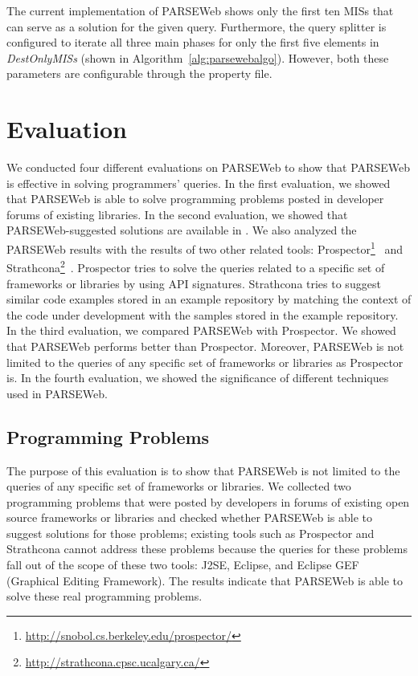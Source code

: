 \documentclass{fp035-thummalapenta}
\begin{document}
The current implementation of PARSEWeb shows only the first ten MISs
that can serve as a solution for the given query. Furthermore, the
query splitter is configured to iterate all three main phases
for only the first five elements in \emph{DestOnlyMISs} (shown in
Algorithm~\ref{alg:parsewebalgo}). However, both these parameters are
configurable through the property file.

\section{Evaluation}
\label{sec:evaluation}

We conducted four different evaluations on PARSEWeb to show that
PARSEWeb is effective in solving programmers' queries. In the
first evaluation, we showed that PARSEWeb is able to solve
programming problems posted in developer forums of existing
libraries. In the second evaluation, we showed that
PARSEWeb-suggested solutions are available in \realprojects{}. We
also analyzed the PARSEWeb results with the results of two other
related tools:
Prospector\footnote{\url{http://snobol.cs.berkeley.edu/prospector/}}~\cite{prospector:jungloid}
and
Strathcona\footnote{\url{http://strathcona.cpsc.ucalgary.ca/}}~\cite{strathcona:se}.
Prospector tries to solve the queries related to a specific set of
frameworks or libraries by using API signatures. Strathcona tries to
suggest similar code examples stored in an example repository by
matching the context of the code under development with the samples
stored in the example repository. In the third evaluation, we
compared PARSEWeb with Prospector. We showed that PARSEWeb performs
better than Prospector. Moreover, PARSEWeb is not limited to the
queries of any specific set of frameworks or libraries as Prospector
is. In the fourth evaluation, we showed the significance of different techniques used
in PARSEWeb.

\subsection{Programming Problems}
\label{sec:subexperiments}

The purpose of this evaluation is to show that PARSEWeb is not
limited to the queries of any specific set of frameworks or
libraries. We collected two programming problems that were posted
by developers in forums of existing open source frameworks or
libraries and checked whether PARSEWeb is able to suggest solutions
for those problems; existing tools such as Prospector and Strathcona
cannot address these problems because the queries for these problems
fall out of the scope of these two tools: J2SE, Eclipse, and Eclipse
GEF (Graphical Editing Framework). The results indicate that PARSEWeb is able to solve
these real programming problems.
\end{document}

